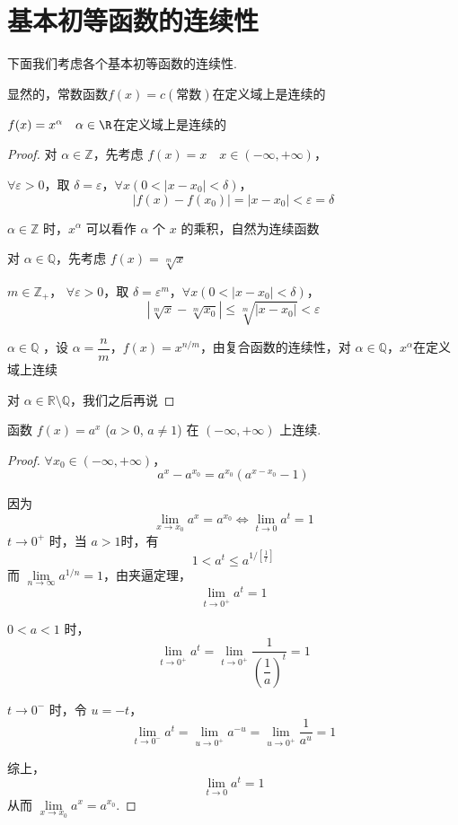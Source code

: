 \section{基本初等函数的连续性}
下面我们考虑各个基本初等函数的连续性.
\begin{proposition}
	显然的，常数函数$f(x)=c(\text{常数})$在定义域上是连续的
\end{proposition}
\begin{proposition}
	$f(x)=x^{\alpha}\quad \alpha\in\R$在定义域上是连续的
\end{proposition}
\begin{proof}
	对 $\alpha \in \mathbb{Z}$，先考虑 $f(x) = x\quad x\in(-\infty, +\infty)$，
	
	$\forall \varepsilon > 0$，取 $\delta = \varepsilon$，$\forall x(0 < |x - x_0| < \delta)$，
	\[ |f(x) - f(x_0)| = |x - x_0| < \varepsilon = \delta \]
	
	$\alpha \in \mathbb{Z}$ 时，$x^\alpha$ 可以看作 $\alpha$ 个 $x$ 的乘积，自然为连续函数
	
	对 $\alpha \in \mathbb{Q}$，先考虑 $f(x) = \sqrt[m]{x}$
	
	$m \in \mathbb{Z}_+$，
	$\forall \varepsilon > 0$，取 $\delta = \varepsilon^m$，$\forall x(0 < |x - x_0| < \delta)$，
	\[ |\sqrt[m]{x} - \sqrt[m]{x_0}| \leqslant\sqrt[m]{|x-x_0|}<\varepsilon \]
	
	$\alpha \in \mathbb{Q}$ ，设 $\alpha = \dfrac{n}{m}$，$f(x) = x^{n/m}$，由复合函数的连续性，对 $\alpha \in \mathbb{Q}$，$x^{\alpha}$在定义域上连续
	
	对 $\alpha \in \mathbb{R} \setminus\mathbb{Q}$，我们之后再说
	
\end{proof}
\begin{proposition}
	函数 $f(x) = a^x$ ($a > 0$, $a \neq 1$) 在 $(-\infty, +\infty)$ 上连续.
\end{proposition}
\begin{proof}
	$\forall x_0 \in (-\infty, +\infty)$，
	\[ a^x - a^{x_0} = a^{x_0}(a^{x - x_0} - 1) \]
	
	因为
	\[ \lim_{x \to x_0} a^x = a^{x_0} \Leftrightarrow \lim_{t \to 0} a^t = 1 \]
	$t \to 0^+$ 时，当 $a > 1$时，有
	\[ 1 < a^t \leqslant a^{1/[\frac{1}{t}]} \]
	而 $\lim\limits_{n \to \infty} a^{1/n} = 1$，由夹逼定理，
	\[ \lim_{t \to 0^+} a^t = 1 \]
	
	$0 < a < 1$ 时，
	\[ \lim_{t \to 0^+} a^t = \lim_{t \to 0^+} \dfrac{1}{\left(\dfrac{1}{a}\right)^t} = 1 \]
	
	$t \to 0^-$ 时，令 $u = -t$，
	\[ \lim_{t \to 0^-} a^t = \lim_{u \to 0^+} a^{-u} = \lim_{u \to 0^+} \frac{1}{a^u} = 1 \]
	
	综上，
	\[ \lim_{t \to 0} a^t = 1 \]
	从而 $\lim\limits_{x \to x_0} a^x = a^{x_0}$.
	
\end{proof}
